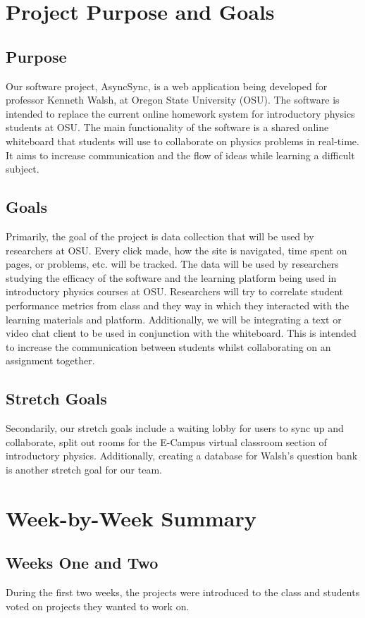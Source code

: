 \documentclass[onecolumn, draftclsnofoot,10pt, compsoc]{IEEEtran}
\begin{document}
\section{Project Purpose and Goals}
\subsection{Purpose}
Our software project, AsyncSync, is a web application being developed for professor Kenneth Walsh, at Oregon State University (OSU). The software is intended to replace the current online homework system for introductory physics students at OSU. The main functionality of the software is a shared online whiteboard that students will use to collaborate on physics problems in real-time. It aims to increase communication and the flow of ideas while learning a difficult subject.
\subsection{Goals}
Primarily, the goal of the project is data collection that will be used by researchers at OSU. Every click made, how the site is navigated, time spent on pages, or problems, etc. will be tracked. The data will be used by researchers studying the efficacy of the software and the learning platform being used in introductory physics courses at OSU. Researchers will try to correlate student performance metrics from class and they way in which they interacted with the learning materials and platform. Additionally, we will be integrating a text or video chat client to be used in conjunction with the whiteboard. This is intended to increase the communication between students whilst collaborating on an assignment together.
\subsection{Stretch Goals}
Secondarily, our stretch goals include a waiting lobby for users to sync up and collaborate, split out rooms for the E-Campus virtual classroom section of introductory physics. Additionally, creating a database for Walsh’s question bank is another stretch goal for our team.

\section{Week-by-Week Summary}
\subsection{Weeks One and Two}
During the first two weeks, the projects were introduced to the class and students voted on projects they wanted to work on.
\end{document}

